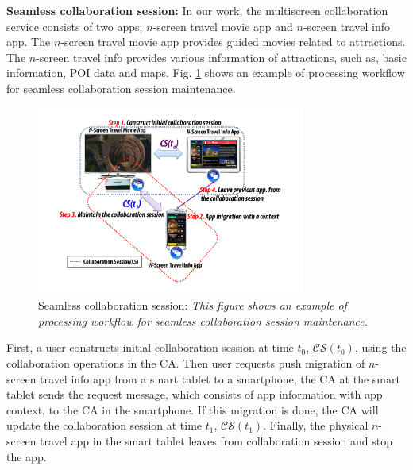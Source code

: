 \documentclass[conference]{IEEEtran}
\begin{document}
\noindent
\textbf{Seamless collaboration session:}  
In our work, the multiscreen collaboration service consists of two apps; $n$-screen travel movie app and $n$-screen travel info app. 
The $n$-screen travel movie app provides guided movies related to attractions. 
The $n$-screen travel info provides various information of attractions, such as, basic information, POI data and maps.
Fig. \ref{fig:pushmigration} shows an example of processing workflow  for seamless collaboration session maintenance. 
    \begin{figure}[htb] %
    \centering
    \includegraphics[width=8.8cm,keepaspectratio]{seamless}
    \caption{Seamless collaboration session: \emph{This figure shows an example of processing workflow for seamless collaboration session maintenance.}}
    \label{fig:pushmigration}
    \end{figure}
First, a user constructs initial collaboration session at time $t_0$, $\mathcal{CS}(t_0)$, using the collaboration operations in the CA.
Then user requests push migration of $n$-screen travel info app from a smart tablet to a smartphone, the CA at the smart tablet sends the request message, which consists of app information with app context, to the CA in the smartphone. If this migration is done, the CA will update the collaboration session at time $t_1$, $\mathcal{CS}(t_1)$. Finally, the physical $n$-screen travel app in the smart tablet leaves from collaboration session and stop the app. 
\end{document}
